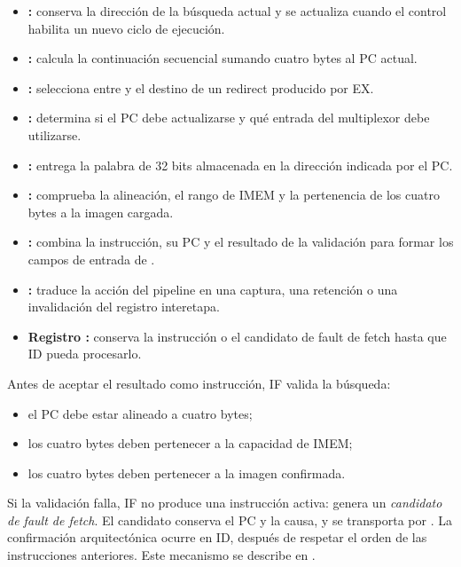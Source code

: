\begin{itemize}
  \item \textbf{:} conserva la dirección de la búsqueda actual y se
    actualiza cuando el control habilita un nuevo ciclo de ejecución.
  \item \textbf{:} calcula la continuación secuencial sumando
    cuatro bytes al PC actual.
  \item \textbf{:} selecciona entre  y el
    destino de un redirect producido por EX.
  \item \textbf{:} determina si el PC debe actualizarse
    y qué entrada del multiplexor debe utilizarse.
  \item \textbf{:} entrega la palabra de 32 bits
    almacenada en la dirección indicada por el PC.
  \item \textbf{:} comprueba la alineación, el rango
    de IMEM y la pertenencia de los cuatro bytes a la imagen cargada.
  \item \textbf{:} combina la instrucción, su PC y el
    resultado de la validación para formar los campos de entrada de .
  \item \textbf{:} traduce la acción del pipeline en
    una captura, una retención o una invalidación del registro interetapa.
  \item \textbf{Registro :} conserva la instrucción o el candidato
    de fault de fetch hasta que ID pueda procesarlo.
\end{itemize}

Antes de aceptar el resultado como instrucción, IF valida la búsqueda:

\begin{itemize}
  \item el PC debe estar alineado a cuatro bytes;
  \item los cuatro bytes deben pertenecer a la capacidad de IMEM;
  \item los cuatro bytes deben pertenecer a la imagen confirmada.
\end{itemize}

Si la validación falla, IF no produce una instrucción activa: genera un
\emph{candidato de fault de fetch}. El candidato conserva el PC y la causa, y
se transporta por . La confirmación arquitectónica ocurre en ID,
después de respetar el orden de las instrucciones anteriores. Este mecanismo se
describe en .

